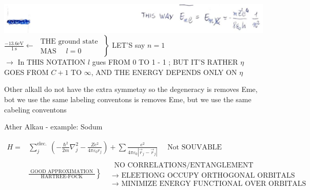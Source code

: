 \documentclass[10pt]{article}
\begin{document}
\includegraphics[max width=\textwidth, center]{2025_10_16_22329e0f50bdd2511b17g-11}\\
$\left.\frac{-13.6 \mathrm{eV}}{1 \mathrm{~s}} \leftarrow \begin{array}{l}\text { THE ground state } \\ \text { MAS } \quad l=0\end{array}\right\}$ LET'S say $n=1$\\
$\rightarrow$ In THIS NOTATION $l$ gues FROM 0 TO 1 - 1 ; BUT IT'S RATHER $\eta$ GOES FROM $C+1$ TO $\infty$, AND THE ENERGY DEPENDS ONLY ON $\eta$

Other alkall do not have the extra symmetay so the degeneracy is removes Eme, bot we use the same labeling conventons is removes Eme, but we use the same cabeling conventons

Ather Alkau - example: Sodum

$$
\begin{aligned}
H= & \sum_{j}^{\text {elec. }}\left(-\frac{\hbar^{2}}{2 m} \nabla_{j}^{2}-\frac{Z e^{2}}{4 \pi \varepsilon_{0} r_{j}}\right)+\sum \frac{e^{2}}{4 \pi \varepsilon_{0}\left|\vec{r}_{j}-\vec{r}_{j}\right|} \quad \text { Not SOUVABLE } \\
& \left.\frac{\text { GOOD APPROXIMATION }}{\text { HARTREE-FOCK }}\right\} \quad \begin{array}{l}
\text { NO CORRELATIONS/ENTANGLEMENT } \\
\rightarrow \text { ELEETIONG OCCUPY ORTHOGONAL ORBITALS } \\
\rightarrow \text { MINIMIZE ENERGY FUNCTIONAL OVER ORBITALS }
\end{array}
\end{aligned}
$$
\end{document}
